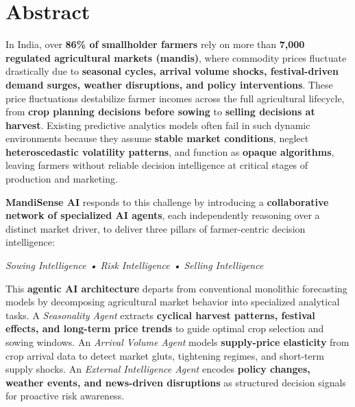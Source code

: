 \documentclass[12pt,a4paper]{report}
\begin{document}
\chapter*{Abstract}

\noindent
In India, over \textbf{86\% of smallholder farmers} rely on more than \textbf{7,000 regulated agricultural markets (mandis)}, where commodity prices fluctuate drastically due to \textbf{seasonal cycles, arrival volume shocks, festival-driven demand surges, weather disruptions, and policy interventions}. These price fluctuations destabilize farmer incomes across the full agricultural lifecycle, from \textbf{crop planning decisions before sowing} to \textbf{selling decisions at harvest}. Existing predictive analytics models often fail in such dynamic environments because they assume \textbf{stable market conditions}, neglect \textbf{heteroscedastic volatility patterns}, and function as \textbf{opaque algorithms}, leaving farmers without reliable decision intelligence at critical stages of production and marketing.

\vspace{0.6em}

\noindent
\textbf{MandiSense AI} responds to this challenge by introducing a \textbf{collaborative network of specialized AI agents}, each independently reasoning over a distinct market driver, to deliver three pillars of farmer-centric decision intelligence:
\begin{center}
\textit{Sowing Intelligence \quad • \quad Risk Intelligence \quad • \quad Selling Intelligence}
\end{center}

\noindent
This \textbf{agentic AI architecture} departs from conventional monolithic forecasting models by decomposing agricultural market behavior into specialized analytical tasks. A \textit{Seasonality Agent} extracts \textbf{cyclical harvest patterns, festival effects, and long-term price trends} to guide optimal crop selection and sowing windows. An \textit{Arrival Volume Agent} models \textbf{supply-price elasticity} from crop arrival data to detect market gluts, tightening regimes, and short-term supply shocks. An \textit{External Intelligence Agent} encodes \textbf{policy changes, weather events, and news-driven disruptions} as structured decision signals for proactive risk awareness.

\vspace{0.6em}
\end{document}
